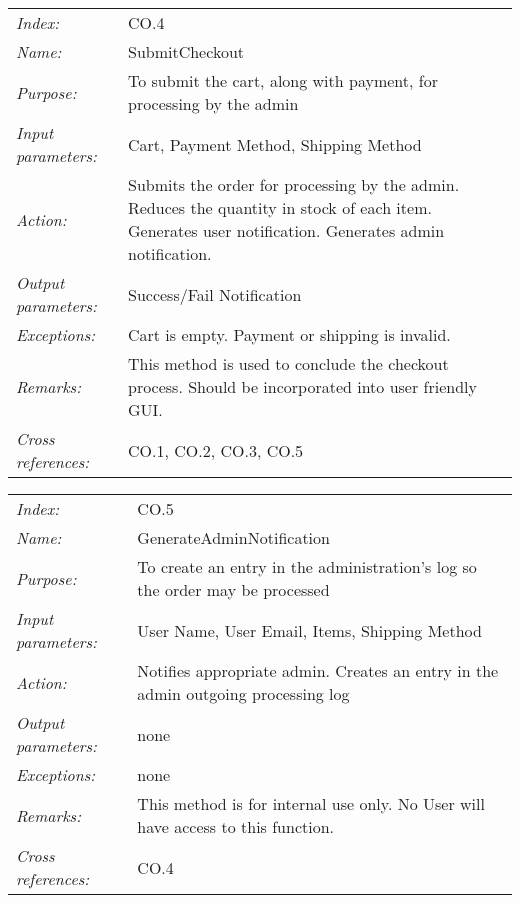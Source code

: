 \documentclass[10pt,letter]{article}
\begin{document}
\begin{tabularx}{\textwidth}{l X}

    \it{Index:} & CO.4 \\

    \it{Name:} &  SubmitCheckout\\

    \it{Purpose:} &  To submit the cart, along with payment, for processing by the admin\\

    \it{Input parameters:} & Cart, Payment Method, Shipping Method \\

    \it{Action:} & Submits the order for processing by the admin. Reduces the quantity in stock of each item. Generates user notification. Generates admin notification. \\

    \it{Output parameters:} & Success/Fail Notification \\

    \it{Exceptions:} & Cart is empty. Payment or shipping is invalid. \\

    \it{Remarks:} & This method is used to conclude the checkout process. Should be incorporated into user friendly GUI.\\

    \it{Cross references:} & CO.1, CO.2, CO.3, CO.5 \\

    \hline

\end{tabularx}
\begin{tabularx}{\textwidth}{l X}

    \it{Index:} & CO.5 \\

    \it{Name:} & GenerateAdminNotification\\

    \it{Purpose:} &  To create an entry in the administration’s log so the order may be processed\\

    \it{Input parameters:} & User Name, User Email, Items, Shipping Method  \\

    \it{Action:} & Notifies appropriate admin. Creates an entry in the admin outgoing processing log\\

    \it{Output parameters:} & none\\

    \it{Exceptions:} & none \\

    \it{Remarks:} & This method is for internal use only. No User will have access to this function.\\

    \it{Cross references:} & CO.4 \\

    \hline

\end{tabularx}
\end{document}
